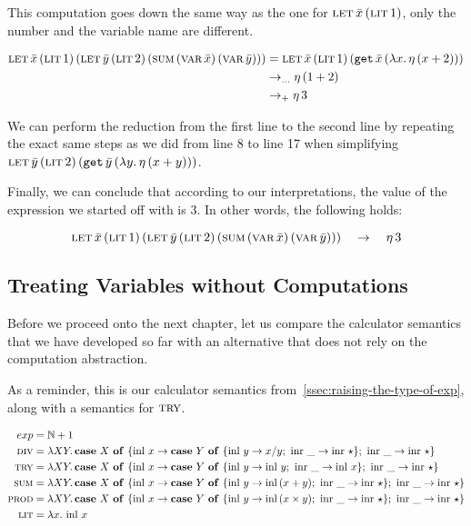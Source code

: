 This computation goes down the same way as the one for
$\app{\lete}{\bar{x}}{\litec{1}}$, only the number and the variable name
are different.


\begin{align*}
\letecn{x}{\litec{1}}{\letec{y}{\litec{2}}{\sumec{\varec{x}}{\varec{y}}}}
& = \letecn{x}{\litec{1}}{(\app{\op{get}}{\bar{x}} {(\lam{x}{\ap{\eta}{(x + 2)}})})} \\
& \to_{\ldots} \ap{\eta}{(1 + 2)} \\
& \to_{+} \ap{\eta}{3}
\end{align*}

We can perform the reduction from the first line to the second line by
repeating the exact same steps as we did from line 8 to line 17 when
simplifying $\appp{\lete}{\bar{y}}{\litec{2}}
{(\app{\op{get}}{\bar{y}}{(\lam{y}{\ap{\eta}{(x + y)}})})}$.

Finally, we can conclude that according to our interpretations, the
value of the expression we started off with is $3$. In other words, the
following holds:

$$
\letecn{x}{\litec{1}}{\letec{y}{\litec{2}}{\sumec{\varec{x}}{\varec{y}}}}
\quad \to \quad
\ap{\eta}{3}
$$


\subsection{Treating Variables without Computations}

Before we proceed onto the next chapter, let us compare the calculator
semantics that we have developed so far with an alternative that does not
rely on the computation abstraction.

As a reminder, this is our calculator semantics
from~\ref{ssec:raising-the-type-of-exp}, along with a semantics for
$\trye$.

\begin{align*}
  exp &= \NN + 1 \\
  \dive &= \lam{X Y}{\case{X}{x}{\case{Y}{y}{x / y}{\_}{\ap{\inr}{\star}}}{\_}{\ap{\inr}{\star}}} \\ 
  \trye &= \lam{X Y}{\case{X}{x}{\case{Y}{y}{\ap{\inl}{y}}{\_}{\ap{\inl}{x}}}{\_}{\ap{\inr}{\star}}} \\ 
  \sume &= \lam{X Y}{\case{X}{x}{\case{Y}{y}{\ap{\inl}{(x + y)}}{\_}{\ap{\inr}{\star}}}{\_}{\ap{\inr}{\star}}} \\ 
  \prode &= \lam{X Y}{\case{X}{x}{\case{Y}{y}{\ap{\inl}{(x \times y)}}{\_}{\ap{\inr}{\star}}}{\_}{\ap{\inr}{\star}}} \\ 
  \lite &= \lam{x}{\ap{\inl}{x}}
\end{align*}

